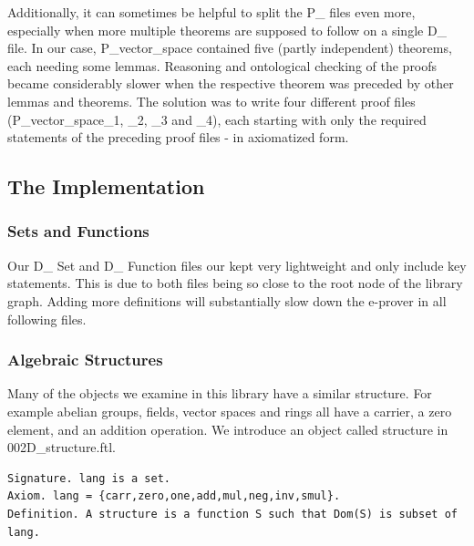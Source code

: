 \documentclass[11pt]{article}
\begin{document}
\begin{figure}[h]
\begin{center}
\end{center}
\end{figure}

Additionally, it can sometimes be helpful to split the P\_ files even more, especially when more multiple theorems are supposed to follow on a single D\_ file. In our case, P\_vector\_space contained five (partly independent) theorems, each needing some lemmas. Reasoning and ontological checking of the proofs became considerably slower when the respective theorem was preceded by other lemmas and theorems. The solution was to write four different proof files (P\_vector\_space\_1, \_2, \_3 and \_4), each starting with only the required statements of the preceding proof files - in axiomatized form.


\subsection{The Implementation}

\subsubsection{Sets and Functions}

Our D\_ Set and D\_ Function files our kept very lightweight and only include key statements. This is due to both files being so close to the root node of the library graph. Adding more definitions will substantially slow down the e-prover in all following files.

\subsubsection{Algebraic Structures} \label{algebraicStructures}
Many of the objects we examine in this library have a similar structure. For example abelian groups, fields, vector spaces and rings all have a carrier, a zero element, and an addition operation. We introduce an object called structure in 002D\_structure.ftl.
\begin{lstlisting}
Signature. lang is a set.
Axiom. lang = {carr,zero,one,add,mul,neg,inv,smul}.
Definition. A structure is a function S such that Dom(S) is subset of lang.
\end{lstlisting}
\end{document}
